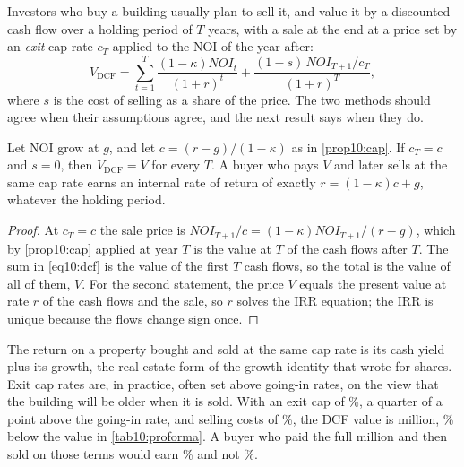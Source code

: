 \begin{chapterrefs}
Investors who buy a building usually plan to sell it, and value it by a discounted cash flow over a
holding period of $T$ years, with a sale at the end at a price set by an \emph{exit} cap rate $c_T$
applied to the NOI of the year after:
\begin{equation}\label{eq10:dcf}
  V_{\mathrm{DCF}} = \sum_{t=1}^{T}\frac{(1-\kappa)\mathit{NOI}_t}{(1+r)^t}
  + \frac{(1-s)\,\mathit{NOI}_{T+1}/c_T}{(1+r)^T},
\end{equation}
where $s$ is the cost of selling as a share of the price. The two methods should agree when their
assumptions agree, and the next result says when they do.

\begin{proposition}\label{prop10:dcf}
Let NOI grow at $g$, and let $c=(r-g)/(1-\kappa)$ as in \cref{prop10:cap}. If $c_T=c$ and $s=0$, then
$V_{\mathrm{DCF}}=V$ for every $T$. A buyer who pays $V$ and later sells at the same cap rate earns an
internal rate of return of exactly $r=(1-\kappa)c+g$, whatever the holding period.
\end{proposition}

\begin{proof}
At $c_T=c$ the sale price is $\mathit{NOI}_{T+1}/c=(1-\kappa)\mathit{NOI}_{T+1}/(r-g)$, which by
\cref{prop10:cap} applied at year $T$ is the value at $T$ of the cash flows after $T$. The sum in
\cref{eq10:dcf} is the value of the first $T$ cash flows, so the total is the value of all of them, $V$.
For the second statement, the price $V$ equals the present value at rate $r$ of the cash flows and the
sale, so $r$ solves the IRR equation; the IRR is unique because the flows change sign once.
\end{proof}

The return on a property bought and sold at the same cap rate is its cash yield plus its growth, the
real estate form of the growth identity that \textcite{gordon1956} wrote for shares. Exit cap rates are, in practice, often
set above going-in rates, on the view that the building will be older when it is sold. With an exit
cap of \pfExit\%, a quarter of a point above the going-in rate, and selling costs of \pfSaleCost\%,
the DCF value is \pfValueDcf{} million, \pfDcfGapAbs\% below the value in \cref{tab10:proforma}. A buyer who
paid the full \pfValue{} million and then sold on those terms would earn \pfIrr\% and not \pfIrrSame\%.


\end{chapterrefs}
